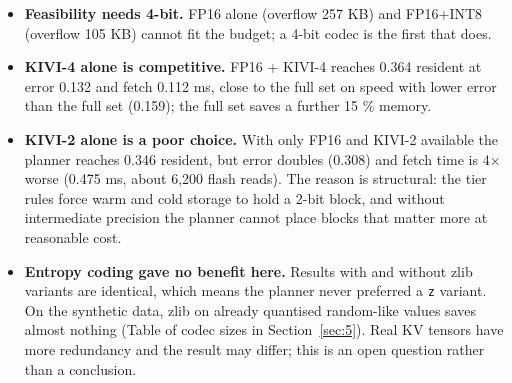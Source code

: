 \documentclass[12pt,a4paper]{report}
\begin{document}
\begin{itemize}
\item \textbf{Feasibility needs 4-bit.} FP16 alone (overflow 257 KB) and FP16+INT8 (overflow 105 KB) cannot fit the budget; a 4-bit codec is the first that does.
\item \textbf{KIVI-4 alone is competitive.} FP16 + KIVI-4 reaches 0.364 resident at error 0.132 and fetch 0.112 ms, close to the full set on speed with lower error than the full set (0.159); the full set saves a further 15 \% memory.
\item \textbf{KIVI-2 alone is a poor choice.} With only FP16 and KIVI-2 available the planner reaches 0.346 resident, but error doubles (0.308) and fetch time is 4× worse (0.475 ms, about 6,200 flash reads). The reason is structural: the tier rules force warm and cold storage to hold a 2-bit block, and without intermediate precision the planner cannot place blocks that matter more at reasonable cost.
\item \textbf{Entropy coding gave no benefit here.} Results with and without zlib variants are identical, which means the planner never preferred a \texttt{z} variant. On the synthetic data, zlib on already quantised random-like values saves almost nothing (Table of codec sizes in Section~\ref{sec:5}). Real KV tensors have more redundancy and the result may differ; this is an open question rather than a conclusion.
\end{itemize}
\end{document}
